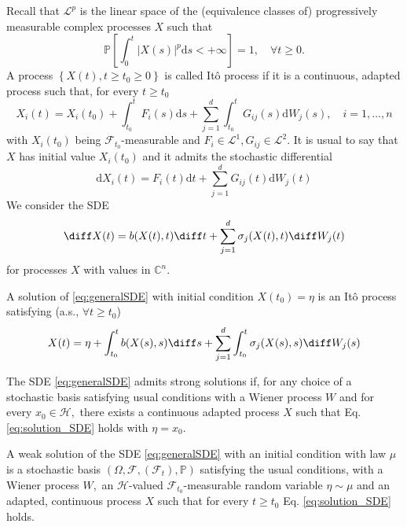 Recall that $ \mathcal{L}^{p}$ is the linear space of the (equivalence classes of) progressively measurable complex processes $X$ such that \[ \mathbb{P}\left[\int_{0}^{t}|X(s)|^{p} \mathrm{d} s<+\infty\right]=1, \quad \forall t \geq 0. \]
A process $\left\{X(t), t \geq t_{0} \geq 0\right\}$ is called Itô process if it is a continuous, adapted process such that, for every $t \geq t_{0}$ \[ X_{i}(t)=X_{i}\left(t_{0}\right)+\int_{t_{0}}^{t} F_{i}(s) \mathrm{d} s+\sum_{j=1}^{d} \int_{t_{0}}^{t} G_{i j}(s) \mathrm{d} W_{j}(s), \quad i=1, \ldots, n \] with $X_{i}\left(t_{0}\right)$ being $\mathcal{F}_{t_{0}}$-measurable and $F_{i} \in \mathcal{L}^{1}, G_{i j} \in \mathcal{L}^{2} .$ It is usual to say that $X$ has initial value $X_{i}\left(t_{0}\right)$ and it admits the stochastic differential \[ \mathrm{d} X_{i}(t)=F_{i}(t) \mathrm{d} t+\sum_{j=1}^{d} G_{i j}(t) \mathrm{d} W_{j}(t) \]
We consider the SDE
\begin{equation}\label{eq:generalSDE}
\diff X(t)=b(X(t), t) \diff t+\sum_{j=1}^{d} \sigma_{j}(X(t), t) \diff W_{j}(t)
\end{equation}
for processes $  X  $ with values in $ \mathbb{C}^{n}$.

A solution of \eqref{eq:generalSDE} with initial condition $X\left(t_{0}\right)=\eta$ is an Itô process satisfying (a.s., $ \forall t \geq t_{0}$)
 \begin{equation}\label{eq:solution_SDE}
  X(t)=\eta+\int_{t_{0}}^{t} b(X(s), s) \diff s+\sum_{j=1}^{d} \int_{t_{0}}^{t} \sigma_{j}(X(s), s) \diff W_{j}(s)
 \end{equation}


 \begin{definition}\label{def:strong_solution_SDE}
 	The SDE \eqref{eq:generalSDE} admits strong solutions if, for any choice of a stochastic basis satisfying usual conditions with a Wiener process $W$ and for every $x_{0} \in \mathcal{H},$ there exists a continuous adapted process $X$ such that Eq. \eqref{eq:solution_SDE} holds with $\eta=x_{0}$.
 \end{definition}

 \begin{definition}\label{def:weak_solution_SDE}
 	A weak solution of the SDE \eqref{eq:generalSDE} with an initial condition with law $\mu$ is a stochastic basis $\left(\Omega, \mathcal{F},\left(\mathcal{F}_{t}\right), \mathbb{P}\right)$ satisfying the usual conditions, with a Wiener process $W,$ an $\mathcal{H}$-valued $\mathcal{F}_{t_{0}}$-measurable random variable $\eta \sim \mu$ and an adapted, continuous process $X$ such that for every $t \geq t_{0} $ Eq. \eqref{eq:solution_SDE} holds.
 \end{definition}


